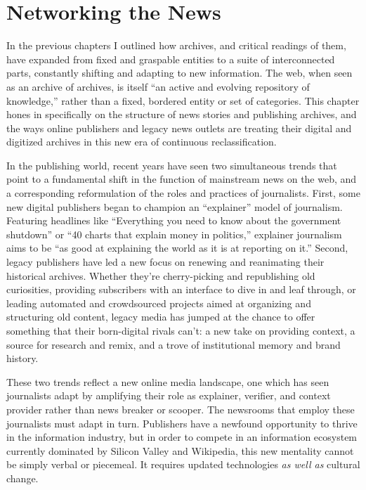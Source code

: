 \chapter{Networking the News}

In the previous chapters I outlined how archives, and critical readings of them, have expanded from fixed and graspable entities to a suite of interconnected parts, constantly shifting and adapting to new information. The web, when seen as an archive of archives, is itself ``an active and evolving repository of knowledge,'' rather than a fixed, bordered entity or set of categories.\autocite[2]{chakrabarti_mining_2003} This chapter hones in specifically on the structure of news stories and publishing archives, and the ways online publishers and legacy news outlets are treating their digital and digitized archives in this new era of continuous reclassification.


In the publishing world, recent years have seen two simultaneous trends that point to a fundamental shift in the function of mainstream news on the web, and a corresponding reformulation of the roles and practices of journalists. First, some new digital publishers began to champion an ``explainer'' model of journalism. Featuring headlines like ``Everything you need to know about the government shutdown'' or ``40 charts that explain money in politics,'' explainer journalism aims to be ``as good at explaining the world as it is at reporting on it.''\autocite{klein_vox_2014} Second, legacy publishers have led a new focus on renewing and reanimating their historical archives. Whether they're cherry-picking and republishing old curiosities, providing subscribers with an interface to dive in and leaf through, or leading automated and crowdsourced projects aimed at organizing and structuring old content, legacy media has jumped at the chance to offer something that their born-digital rivals can't: a new take on providing context, a source for research and remix, and a trove of institutional memory and brand history.

These two trends reflect a new online media landscape, one which has seen journalists adapt by amplifying their role as explainer, verifier, and context provider rather than news breaker or scooper. The newsrooms that employ these journalists must adapt in turn. Publishers have a newfound opportunity to thrive in the information industry, but in order to compete in an information ecosystem currently dominated by Silicon Valley and Wikipedia, this new mentality cannot be simply verbal or piecemeal. It requires updated technologies \emph{as well as} cultural change.

